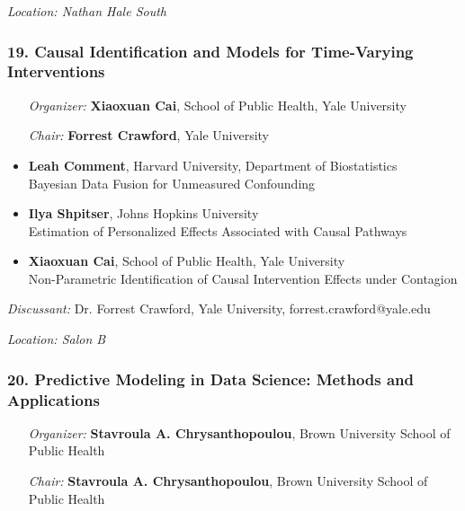 \emph{Location: Nathan Hale South}

\subsubsection*{19. Causal Identification and Models for Time-Varying Interventions}

\begin{enumerate}[align=left]
\item [\emph{Organizer:}] \textbf{Xiaoxuan Cai}, School of Public Health, Yale University
\item [\emph{Chair:}] \textbf{Forrest Crawford},  Yale University
\end{enumerate}

\begin{itemize}
\item \textbf{Leah Comment}, Harvard University, Department of Biostatistics \\
Bayesian Data Fusion for Unmeasured Confounding
\item \textbf{Ilya Shpitser}, Johns Hopkins University \\
Estimation of Personalized Effects Associated with Causal Pathways
\item \textbf{Xiaoxuan Cai}, School of Public Health, Yale University \\
Non-Parametric Identification of Causal Intervention Effects under Contagion
\end{itemize}

\emph{Discussant:} Dr. Forrest Crawford, Yale University, forrest.crawford@yale.edu

\emph{Location: Salon B}

\subsubsection*{20. Predictive Modeling in Data Science: Methods and Applications}

\begin{enumerate}[align=left]
\item [\emph{Organizer:}] \textbf{Stavroula A. Chrysanthopoulou}, Brown University School of Public Health
\item [\emph{Chair:}] \textbf{Stavroula A. Chrysanthopoulou}, Brown University School of Public Health
\end{enumerate}

